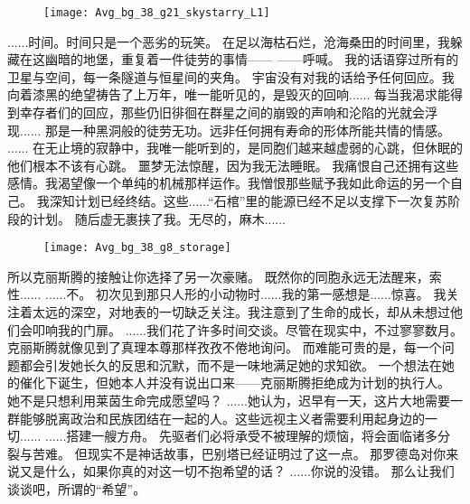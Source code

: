 \documentclass[openany]{book}
\begin{document}
\begin{dialogue}
\begin{figure}[h]
        \texttt{[image: Avg\_bg\_38\_g21\_skystarry\_L1]}
    \end{figure}
     ......时间。时间只是一个恶劣的玩笑。
     在足以海枯石烂，沧海桑田的时间里，我躲藏在这幽暗的地堡，重复着一件徒劳的事情——
     ——呼喊。
     我的话语穿过所有的卫星与空间，每一条隧道与恒星间的夹角。
     宇宙没有对我的话给予任何回应。我向着漆黑的绝望祷告了上万年，唯一能听见的，是毁灭的回响......
     每当我渴求能得到幸存者们的回应，那些仍旧徘徊在群星之间的崩毁的声响和沦陷的光就会浮现......
     那是一种黑洞般的徒劳无功。远非任何拥有寿命的形体所能共情的情感。
     ......
     在无止境的寂静中，我唯一能听到的，是同胞们越来越虚弱的心跳，但休眠的他们根本不该有心跳。
     噩梦无法惊醒，因为我无法睡眠。
     我痛恨自己还拥有这些感情。我渴望像一个单纯的机械那样运作。我憎恨那些赋予我如此命运的另一个自己。
     我深知计划已经终结。这些......“石棺”里的能源已经不足以支撑下一次复苏阶段的计划。
     随后虚无裹挟了我。无尽的，麻木......
    \begin{figure}[h]
        \centering
        \texttt{[image: Avg\_bg\_38\_g8\_storage]}
    \end{figure}
     所以克丽斯腾的接触让你选择了另一次豪赌。
     既然你的同胞永远无法醒来，索性......
     ......不。
     初次见到那只人形的小动物时......我的第一感想是......惊喜。
     我关注着太远的深空，对地表的一切缺乏关注。我注意到了生命的成长，却从未想过他们会叩响我的门扉。
     ......我们花了许多时间交谈。尽管在现实中，不过寥寥数月。
     克丽斯腾就像见到了真理本尊那样孜孜不倦地询问。
     而难能可贵的是，每一个问题都会引发她长久的反思和沉默，而不是一味地满足她的求知欲。
     一个想法在她的催化下诞生，但她本人并没有说出口来——克丽斯腾拒绝成为计划的执行人。
     她不是只想利用莱茵生命完成愿望吗？
     ......她认为，迟早有一天，这片大地需要一群能够脱离政治和民族团结在一起的人。这些远视主义者需要利用起身边的一切......
     ......搭建一艘方舟。
     先驱者们必将承受不被理解的烦恼，将会面临诸多分裂与苦难。
     但现实不是神话故事，巴别塔已经证明过了这一点。
     那罗德岛对你来说又是什么，如果你真的对这一切不抱希望的话？
     ......你说的没错。
     那么让我们谈谈吧，所谓的“希望”。

\end{dialogue}
\end{document}
